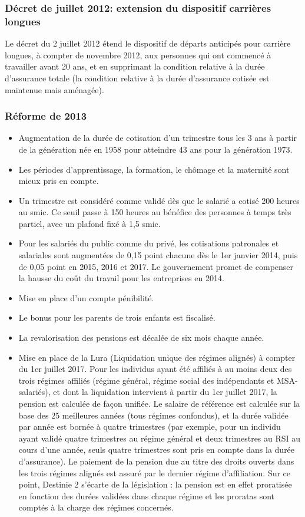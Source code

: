 \subsubsection{Décret de juillet 2012: extension du dispositif carrières longues}

Le décret du 2 juillet 2012 étend le dispositif de départs anticipés pour carrière longues, à compter de novembre 2012, aux personnes qui ont commencé à travailler avant 20 ans, et en supprimant la condition relative à la durée d'assurance totale (la condition relative à la durée d'assurance cotisée est maintenue mais aménagée).

\subsubsection{Réforme de 2013}
\begin{itemize}
   \item Augmentation de la durée de cotisation d'un trimestre tous les 3 ans à partir de la génération née en 1958 pour atteindre 43 ans pour la génération 1973.
   \item Les périodes d'apprentissage, la formation, le chômage et la maternité sont mieux pris en compte.
   \item Un trimestre est considéré comme validé dès que le salarié a cotisé 200 heures au smic. Ce seuil passe à 150 heures au bénéfice des personnes à temps très partiel, avec un plafond fixé à 1,5 smic.
   \item Pour les salariés du public comme du privé, les cotisations patronales et salariales sont augmentées de 0,15 point chacune dès le 1er janvier 2014, puis de 0,05 point en 2015, 2016 et 2017. Le gouvernement promet de compenser la hausse du coût du travail pour les entreprises en 2014.
   \item Mise en place d'un compte pénibilité.
   \item Le bonus pour les parents de trois enfants est fiscalisé.
   \item La revalorisation des pensions est décalée de six mois chaque année.
   \item Mise en place de la Lura (Liquidation unique des régimes alignés) à compter du 1er juillet 2017. Pour les individus ayant été affiliés à au moins deux des trois régimes affiliés (régime général, régime social des indépendants et MSA-salariés), et dont la liquidation intervient à partir du 1er juillet 2017, la pension est calculée de façon unifiée. Le salaire de référence est calculée sur la base des 25 meilleures années (tous régimes confondus), et la durée validée par année est bornée à quatre trimestres (par exemple, pour un individu ayant validé quatre trimestres au régime général et deux trimestres au RSI au cours d'une année, seuls quatre trimestres sont pris en compte dans la durée d'assurance). Le paiement de la pension due au titre des droits ouverts dans les trois régimes alignés est assuré par le dernier régime d’affiliation. Sur ce point, Destinie 2 s'écarte de la législation : la pension est en effet proratisée en fonction des durées validées dans chaque régime et les proratas sont comptés à la charge des régimes concernés.
\end{itemize}

